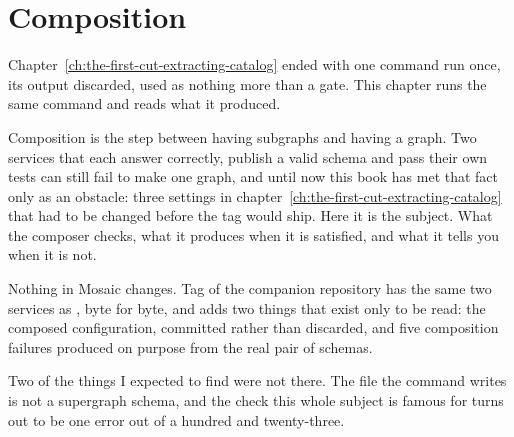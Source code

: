 \chapter{Composition}
\label{ch:composition}

Chapter~\ref{ch:the-first-cut-extracting-catalog} ended with one command run
once, its output discarded, used as nothing more than a gate. This chapter runs
the same command and reads what it produced.

Composition is the step between having subgraphs and having a graph. Two
services that each answer correctly, publish a valid schema and pass their own
tests can still fail to make one graph, and until now this book has met that
fact only as an obstacle: three settings in
chapter~\ref{ch:the-first-cut-extracting-catalog} that had to be changed before
the tag would ship. Here it is the subject. What the composer checks, what it
produces when it is satisfied, and what it tells you when it is not.

Nothing in Mosaic changes. Tag  of the companion repository has the
same two services as , byte for byte, and adds two things that exist
only to be read: the composed configuration, committed rather than discarded,
and five composition failures produced on purpose from the real pair of schemas.

Two of the things I expected to find were not there. The file the command writes
is not a supergraph schema, and the check this whole subject is famous for turns
out to be one error out of a hundred and twenty-three.








